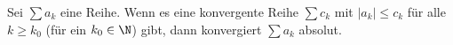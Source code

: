 Sei $\sum a_k$ eine Reihe. Wenn es eine konvergente Reihe $\sum c_k$ mit $|a_k| \leq c_k$ für alle $k \geq k_0$ (für ein $k_0 \in \N$) gibt, dann konvergiert $\sum a_k$ absolut.